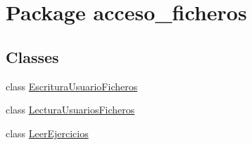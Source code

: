 \hypertarget{namespaceacceso__ficheros}{}\section{Package acceso\+\_\+ficheros}
\label{namespaceacceso__ficheros}
\subsection*{Classes}
\begin{DoxyCompactItemize}
\item 
class \mbox{\hyperlink{classacceso__ficheros_1_1_escritura_usuario_ficheros}{Escritura\+Usuario\+Ficheros}}
\item 
class \mbox{\hyperlink{classacceso__ficheros_1_1_lectura_usuarios_ficheros}{Lectura\+Usuarios\+Ficheros}}
\item 
class \mbox{\hyperlink{classacceso__ficheros_1_1_leer_ejercicios}{Leer\+Ejercicios}}
\end{DoxyCompactItemize}
